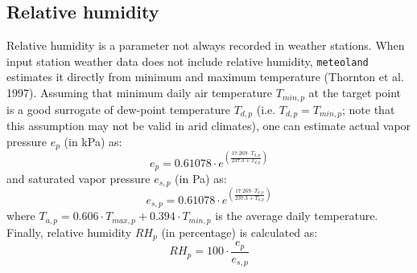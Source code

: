 \documentclass[11pt,a4paper]{article}
\begin{document}
\subsection{Relative humidity}
Relative humidity is a parameter not always recorded in weather stations. When input station weather data does not include relative humidity, \texttt{meteoland} estimates it directly from minimum and maximum temperature (Thornton et al. 1997). Assuming that minimum daily air temperature $T_{min,p}$ at the target point is a good surrogate of dew-point temperature $T_{d,p}$ (i.e. $T_{d,p} = T_{min,p}$; note that this assumption may not be valid in arid climates), one can estimate actual vapor pressure $e_{p}$ (in kPa) as:
\begin{equation}
e_{p} = 0.61078 \cdot e^{\left(\frac{17.269\cdot T_{d,p}}{237.3+T_{d,p}}\right)}
\end{equation}
and saturated vapor pressure $e_{s,p}$ (in Pa) as:
\begin{equation}
e_{s,p} = 0.61078 \cdot e^{\left(\frac{17.269\cdot T_{a,p}}{237.3+T_{a,p}}\right)}
\end{equation}
where $T_{a,p} = 0.606 \cdot T_{max,p} + 0.394 \cdot T_{min,p}$ is the average daily temperature. Finally, relative humidity $RH_p$ (in percentage) is calculated as:
\begin{equation}
RH_p = 100 \cdot \frac{e_{p}}{e_{s,p}}
\end{equation}
\end{document}
